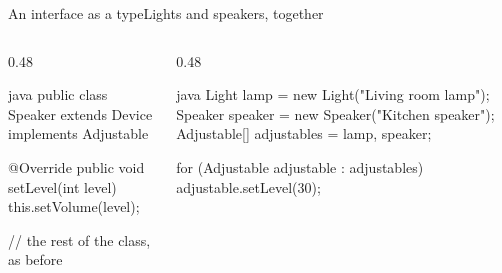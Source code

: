 \documentclass[\deckoptions]{beamer}
\begin{document}
\begin{frame}[fragile]{An interface as a type}{Lights and speakers, together}
  \begin{columns}[T, onlytextwidth]
    \begin{column}{0.48\textwidth}
\begin{codeblock}[steps={1||||}, packed, marks={1/1}]{java}
public class Speaker extends Device implements Adjustable {
    @Override
    public void setLevel(int level) {
        this.setVolume(level);
    }

    // the rest of the class, as before
}
\end{codeblock}
    \end{column}
    \begin{column}{0.48\textwidth}
\begin{codeblock}[steps={none|3|5-7|9-10|}, packed, marks={3/2, 5-7/3, 9-10/4}, marks from=2]{java}
Light lamp = new Light("Living room lamp");
Speaker speaker = new Speaker("Kitchen speaker");
Adjustable[] adjustables = {lamp, speaker};

for (Adjustable adjustable : adjustables) {
    adjustable.setLevel(30);
}


\end{codeblock}
\end{column}
\end{columns}
\end{frame}
\end{document}
